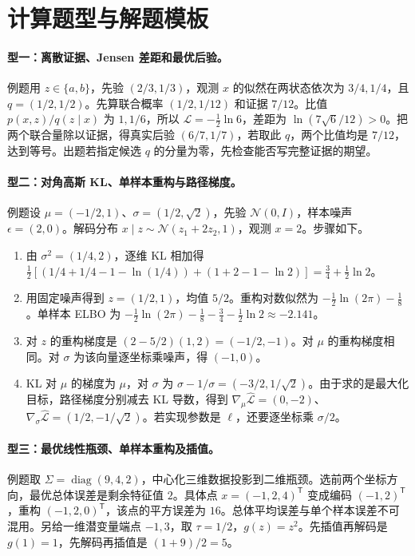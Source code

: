 \documentclass[UTF8,a4paper,zihao=-4,fontset=fandol]{ctexrep}
\begin{document}
\section{计算题型与解题模板}

\paragraph{型一：离散证据、Jensen 差距和最优后验。}
例题用 $z\in\{a,b\}$，先验 $(2/3,1/3)$，观测 $x$ 的似然在两状态依次为 $3/4,1/4$，且 $q=(1/2,1/2)$。先算联合概率 $(1/2,1/12)$ 和证据 $7/12$。比值 $p(x,z)/q(z\mid x)$ 为 $1,1/6$，所以 $\mathcal L=-\tfrac12\ln6$，差距为 $\ln(7\sqrt6/12)>0$。把两个联合量除以证据，得真实后验 $(6/7,1/7)$，若取此 $q$，两个比值均是 $7/12$，达到等号。出题若指定候选 $q$ 的分量为零，先检查能否写完整证据的期望。

\paragraph{型二：对角高斯 KL、单样本重构与路径梯度。}
例题设 $\mu=(-1/2,1)$、$\sigma=(1/2,\sqrt2)$，先验 $\mathcal N(0,I)$，样本噪声 $\epsilon=(2,0)$。解码分布 $x\mid z\sim\mathcal N(z_1+2z_2,1)$，观测 $x=2$。步骤如下。
\begin{enumerate}
\item 由 $\sigma^2=(1/4,2)$，逐维 KL 相加得 $\tfrac12[(1/4+1/4-1-\ln(1/4))+(1+2-1-\ln2)]=\tfrac34+\tfrac12\ln2$。
\item 用固定噪声得到 $z=(1/2,1)$，均值 $5/2$。重构对数似然为 $-\tfrac12\ln(2\pi)-\tfrac18$。单样本 ELBO 为 $-\tfrac12\ln(2\pi)-\tfrac18-\tfrac34-\tfrac12\ln2\approx-2.141$。
\item 对 $z$ 的重构梯度是 $(2-5/2)(1,2)=(-1/2,-1)$。对 $\mu$ 的重构梯度相同。对 $\sigma$ 为该向量逐坐标乘噪声，得 $(-1,0)$。
\item KL 对 $\mu$ 的梯度为 $\mu$，对 $\sigma$ 为 $\sigma-1/\sigma=(-3/2,1/\sqrt2)$。由于求的是最大化目标，路径梯度分别减去 KL 导数，得到 $\nabla_\mu\widehat{\mathcal L}=(0,-2)$、$\nabla_\sigma\widehat{\mathcal L}=(1/2,-1/\sqrt2)$。若实现参数是 $\ell$，还要逐坐标乘 $\sigma/2$。
\end{enumerate}

\paragraph{型三：最优线性瓶颈、单样本重构及插值。}
例题取 $\Sigma=\operatorname{diag}(9,4,2)$，中心化三维数据投影到二维瓶颈。选前两个坐标方向，最优总体误差是剩余特征值 $2$。具体点 $x=(-1,2,4)^{\mathsf T}$ 变成编码 $(-1,2)^{\mathsf T}$，重构 $(-1,2,0)^{\mathsf T}$，该点的平方误差为 $16$。总体平均误差与单个样本误差不可混用。另给一维潜变量端点 $-1,3$，取 $\tau=1/2$，$g(z)=z^2$。先插值再解码是 $g(1)=1$，先解码再插值是 $(1+9)/2=5$。
\end{document}

